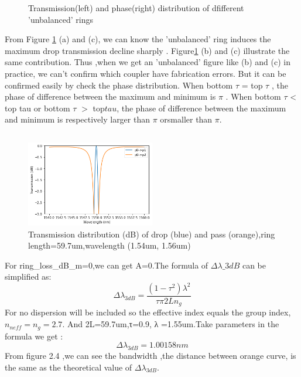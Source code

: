 \documentclass[fontsize=11pt]{scrartcl}
\begin{document}
\begin{figure}[ht]
    \caption{Transmission(left) and phase(right) distribution of dfifferent 'unbalanced' rings}
    \label{T2b}
    \end{figure}
    From Figure \ref{T2b} (a) and (c), we can know the 'unbalanced' ring induces the maximum drop transmission decline sharply .
    Figure\ref{T2b} (b) and (c) illustrate the same contribution.
    Thus ,when we get an 'unbalanced' figure like (b) and (c) in practice, 
    we can't confirm which coupler have fabrication errors. 
    But it can be confirmed easily by check the phase distribution.
    When bottom $\tau$ = top $\tau$ , the phase of difference between the maximum and minimum is $\pi$ .
    When bottom $\tau$ < top tau or bottom $\tau$ $>$ top$ tau $, 
    the phase of difference between the maximum and minimum is respectively larger than $\pi$ orsmaller than $\pi$.
 \subsection{}
 \begin{figure}[h]
    \centering
    \includegraphics[width=0.5\textwidth]{img/T2_3.png}
    \caption{Transmission distribution (dB) of drop (blue) and pass (orange),ring \\
    length=59.7um,wavelength (1.54um, 1.56um)}
    \label{t2_2}
\end{figure}
For ring\_loss\_dB\_m=0,we can get A=0.The formula of $\Delta \lambda \_{3dB}$ can be simplified as:
\begin{equation}
    \Delta \lambda _{3dB}=\frac{(1-\tau^2)\lambda^2}{\tau \pi 2Ln_g}
\end{equation}
For no dispersion will be included so the effective index equals the group index,$n_{neff}=n_g=2.7$.
And  2L=59.7um,τ=0.9, λ =1.55um.Take parameters in the formula we get :
$$\Delta \lambda _{3dB}=1.00158 nm $$
From figure 2.4 ,we can see the bandwidth ,the distance between orange curve, 
is the same as the theoretical value of $\Delta \lambda _{3dB}$. 
\pagebreak
\end{document}
